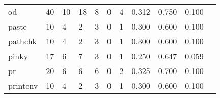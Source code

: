 \begin{longtable}{lp{1.2cm}p{1.2cm}p{1.2cm}p{1.2cm}p{1.2cm}p{1.2cm}p{1.2cm}p{1.2cm}p{1.2cm}p{1.2cm}}
od        &                                    40 &                                                 10 &                                                 18 &                                                  8 &                                                  0 &                                                  4 &                                              0.312 &                                              0.750 &                                              0.100 \\
paste     &                                    10 &                                                  4 &                                                  2 &                                                  3 &                                                  0 &                                                  1 &                                              0.300 &                                              0.600 &                                              0.100 \\
pathchk   &                                    10 &                                                  4 &                                                  2 &                                                  3 &                                                  0 &                                                  1 &                                              0.300 &                                              0.600 &                                              0.100 \\
pinky     &                                    17 &                                                  6 &                                                  7 &                                                  3 &                                                  0 &                                                  1 &                                              0.250 &                                              0.647 &                                              0.059 \\
pr        &                                    20 &                                                  6 &                                                  6 &                                                  6 &                                                  0 &                                                  2 &                                              0.325 &                                              0.700 &                                              0.100 \\
printenv  &                                    10 &                                                  4 &                                                  2 &                                                  3 &                                                  0 &                                                  1 &                                              0.300 &                                              0.600 &                                              0.100 \\

\end{longtable}
